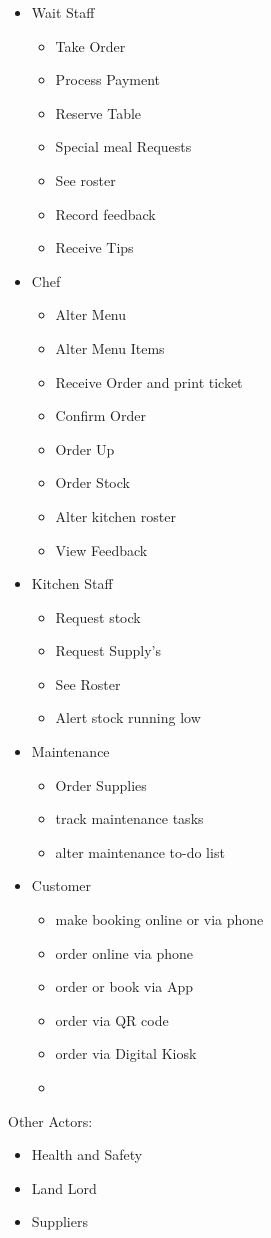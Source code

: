 \documentclass{article}
\begin{document}
\begin{itemize}
    \item {Wait Staff}
    \begin{itemize}
        \item {Take Order}
        \item {Process Payment}
        \item {Reserve Table}
        \item {Special meal Requests}
        \item See roster
        \item Record feedback
        \item Receive Tips
    \end{itemize}
    \item {Chef}
    \begin{itemize}
        \item Alter Menu
        \item Alter Menu Items
        \item Receive Order and print ticket
        \item Confirm Order
        \item Order Up
        \item Order Stock
        \item Alter kitchen roster
        \item View Feedback
    \end{itemize}
    \item {Kitchen Staff}
    \begin{itemize}
        \item Request stock
        \item Request Supply's
        \item See Roster
        \item Alert stock running low
    \end{itemize}
    \item {Maintenance}
    \begin{itemize}
        \item Order Supplies
        \item track maintenance tasks
        \item alter maintenance to-do list
    \end{itemize}
    \item {Customer}
    \begin{itemize}
        \item make booking online or via phone
        \item order online via phone
        \item order or book via App
        \item order via QR code
        \item order via Digital Kiosk
        \item 
    \end{itemize}
\end{itemize}
Other Actors:
\begin{itemize}
    \item {Health and Safety}
    \item {Land Lord}
    \item {Suppliers}
\end{itemize}
\end{document}
